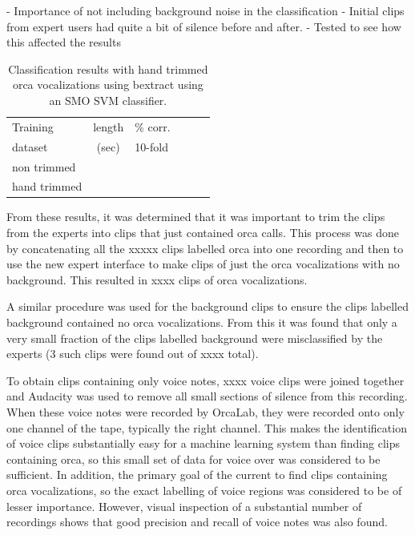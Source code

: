 \documentclass[12pt,oneside]{book}
\begin{document}
- Importance of not including background noise in the classification
- Initial clips from expert users had quite a bit of silence before and after.
- Tested to see how this affected the results

\begin{table}
\begin{tabular}{|l|c|l|l|r|r|}
\hline
Training       & length  & \% corr.     \\
dataset        &  (sec)  &  10-fold     \\
\hline
non trimmed    &         &              \\
hand trimmed   &         &              \\
\hline
\end{tabular}
\caption{Classification results with hand trimmed orca vocalizations
  using bextract using an SMO SVM classifier.}
\label{table:handTrimmed}
\end{table}

From these results, it was determined that it was important to trim
the clips from the experts into clips that just contained orca calls.
This process was done by concatenating all the xxxxx clips labelled
orca into one recording and then to use the new expert interface to
make clips of just the orca vocalizations with no background.  This
resulted in xxxx clips of orca vocalizations.

A similar procedure was used for the background clips to ensure the
clips labelled background contained no orca vocalizations.  From this
it was found that only a very small fraction of the clips labelled
background were misclassified by the experts (3 such clips were found
out of xxxx total).

To obtain clips containing only voice notes, xxxx voice clips were
joined together and Audacity \cite{audacity} was used to remove all
small sections of silence from this recording.  When these voice notes
were recorded by OrcaLab, they were recorded onto only one channel of
the tape, typically the right channel.  This makes the identification
of voice clips substantially easy for a machine learning system than
finding clips containing orca, so this small set of data for voice
over was considered to be sufficient.  In addition, the primary goal
of the current to find clips containing orca vocalizations, so the
exact labelling of voice regions was considered to be of lesser
importance.  However, visual inspection of a substantial number of
recordings shows that good precision and recall of voice notes was
also found.
\end{document}
